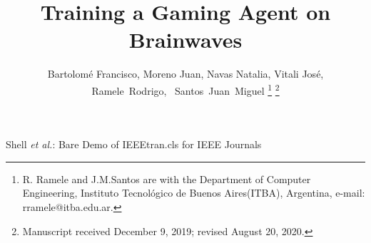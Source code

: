 \documentclass[journal]{IEEEtran}
\begin{document}
%
\title{Training a Gaming Agent on Brainwaves}
%
%
%

\author{Bartolomé Francisco, Moreno Juan,  Navas Natalia, Vitali José, \\
Ramele~Rodrigo,~ 
        Santos~Juan~Miguel%
\thanks{R. Ramele and J.M.Santos are with the Department
of Computer Engineering, Instituto Tecnológico de Buenos Aires(ITBA), Argentina,
e-mail: rramele@itba.edu.ar.}%
\thanks{Manuscript received December 9, 2019; revised August 20, 2020.}}

% 
%



%
{Shell \MakeLowercase{\textit{et al.}}: Bare Demo of IEEEtran.cls for IEEE Journals}
% 
\end{document}
